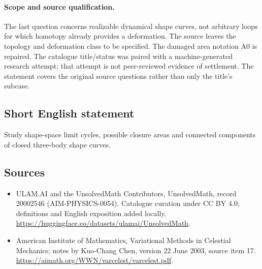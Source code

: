 \documentclass[11pt]{article}
\begin{document}
\paragraph{Scope and source qualification.}The last question concerns realizable dynamical shape curves, not arbitrary loops for which homotopy already provides a deformation. The source leaves the topology and deformation class to be specified. The damaged area notation A0 is repaired. The catalogue title/status was paired with a machine-generated research attempt; that attempt is not peer-reviewed evidence of settlement. The statement covers the original source questions rather than only the title’s subcase.
\subsection{Short English statement}
Study shape-space limit cycles, possible closure areas and connected components of closed three-body shape curves.
\subsection{Sources}
\begin{itemize}
\item[\hypertarget{source:20002546:1}{S1}] ULAM.AI and the UnsolvedMath Contributors, UnsolvedMath, record 20002546 (AIM-PHYSICS-0054). Catalogue curation under CC BY 4.0; definitions and English exposition added locally.
\url{https://huggingface.co/datasets/ulamai/UnsolvedMath}.
\item[\hypertarget{source:20002546:2}{S2}] American Institute of Mathematics, Variational Methods in Celestial Mechanics; notes by Kuo-Chang Chen, version 22 June 2003, source item 17.
\url{https://aimath.org/WWN/varcelest/varcelest.pdf}.
\end{itemize}
\label{end:20002546}
\end{document}
